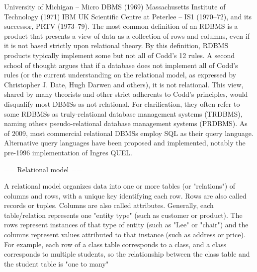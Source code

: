 University of Michigan – Micro DBMS (1969)
Massachusetts Institute of Technology (1971)
IBM UK Scientific Centre at Peterlee – IS1 (1970–72), and its successor, PRTV (1973–79).
The most common definition of an RDBMS is a product that presents a view of data as a collection of rows and columns, even if it is not based strictly upon relational theory. By this definition, RDBMS products typically implement some but not all of Codd's 12 rules.
A second school of thought argues that if a database does not implement all of Codd's rules (or the current understanding on the relational model, as expressed by Christopher J. Date, Hugh Darwen and others), it is not relational. This view, shared by many theorists and other strict adherents to Codd's principles, would disqualify most DBMSs as not relational. For clarification, they often refer to some RDBMSs as truly-relational database management systems (TRDBMS), naming others pseudo-relational database management systems (PRDBMS). 
As of 2009, most commercial relational DBMSs employ SQL as their query language.
Alternative query languages have been proposed and implemented, notably the pre-1996 implementation of Ingres QUEL.


== Relational model ==

A relational model organizes data into one or more tables (or "relations") of columns and rows, with a unique key identifying each row. Rows are also called records or tuples. Columns are also called attributes. Generally, each table/relation represents one "entity type" (such as customer or product). The rows represent instances of that type of entity (such as "Lee" or "chair") and the columns represent values attributed to that instance (such as address or price).
For example, each row of a class table corresponds to a class, and a class corresponds to multiple students, so the relationship between the class table and the student table is "one to many"


